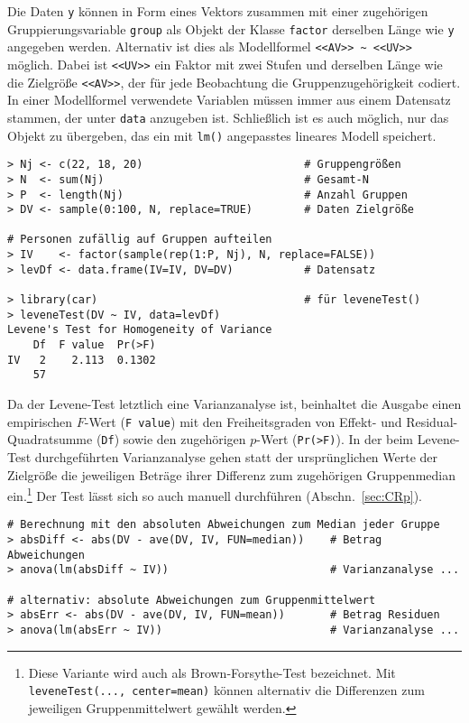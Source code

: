 Die Daten \lstinline!y! können in Form eines Vektors zusammen mit einer zugehörigen Gruppierungsvariable \lstinline!group! als Objekt der Klasse \lstinline!factor! derselben Länge wie \lstinline!y! angegeben werden. Alternativ ist dies als Modellformel \lstinline!<<AV>> ~ <<UV>>! möglich. Dabei ist \lstinline!<<UV>>! ein Faktor mit zwei Stufen und derselben Länge wie die Zielgröße \lstinline!<<AV>>!, der für jede Beobachtung die Gruppenzugehörigkeit codiert. In einer Modellformel verwendete Variablen müssen immer aus einem Datensatz stammen, der unter \lstinline!data! anzugeben ist. Schließlich ist es auch möglich, nur das Objekt zu übergeben, das ein mit \lstinline!lm()! angepasstes lineares Modell speichert. 
\begin{lstlisting}
> Nj <- c(22, 18, 20)                         # Gruppengrößen
> N  <- sum(Nj)                               # Gesamt-N
> P  <- length(Nj)                            # Anzahl Gruppen
> DV <- sample(0:100, N, replace=TRUE)        # Daten Zielgröße

# Personen zufällig auf Gruppen aufteilen
> IV    <- factor(sample(rep(1:P, Nj), N, replace=FALSE))
> levDf <- data.frame(IV=IV, DV=DV)           # Datensatz

> library(car)                                # für leveneTest()
> leveneTest(DV ~ IV, data=levDf)
Levene's Test for Homogeneity of Variance
    Df  F value  Pr(>F)
IV   2    2.113  0.1302
    57
\end{lstlisting}

Da der Levene-Test letztlich eine Varianzanalyse ist, beinhaltet die Ausgabe einen empirischen $F$-Wert (\lstinline!F value!) mit den Freiheitsgraden von Effekt- und Residual-Quadratsumme (\lstinline!Df!) sowie den zugehörigen $p$-Wert (\lstinline!Pr(>F)!). In der beim Levene-Test durchgeführten Varianzanalyse gehen statt der ursprünglichen Werte der Zielgröße die jeweiligen Beträge ihrer Differenz zum zugehörigen Gruppenmedian ein.\footnote{Diese Variante wird auch als Brown-Forsythe-Test bezeichnet. Mit \lstinline!leveneTest(..., center=mean)! können alternativ die Differenzen zum jeweiligen Gruppenmittelwert gewählt werden.} Der Test lässt sich so auch manuell durchführen (Abschn.\ \ref{sec:CRp}).
\begin{lstlisting}
# Berechnung mit den absoluten Abweichungen zum Median jeder Gruppe
> absDiff <- abs(DV - ave(DV, IV, FUN=median))    # Betrag Abweichungen
> anova(lm(absDiff ~ IV))                         # Varianzanalyse ...

# alternativ: absolute Abweichungen zum Gruppenmittelwert
> absErr <- abs(DV - ave(DV, IV, FUN=mean))       # Betrag Residuen
> anova(lm(absErr ~ IV))                          # Varianzanalyse ...
\end{lstlisting}


